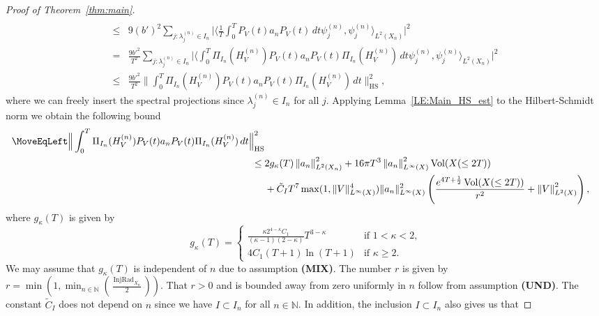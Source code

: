 \documentclass[11pt,twoside,reqno]{amsart}
\newcommand{\N}{\mathbb{N}}
\newcommand{\1}{\mathrm{\mathbf{1}}}
\newcommand{\bHS}{\mathrm{HS}}
\DeclareMathOperator{\Vol}{Vol}
\DeclareMathOperator{\vol}{Vol}
\DeclareMathOperator{\InjRad}{InjRad}
\newcommand{\norm}[1]{\left\lVert#1\right\rVert}
\numberwithin{equation}{section}
\theoremstyle{plain}
\theoremstyle{definition}
\theoremstyle{remark}
\begin{document}
\begin{proof}[Proof of Theorem~\ref{thm:main}]
\begin{equation}
\begin{aligned}
    \\
    \leq{}& 9(b')^2 \sum_{j:\lambda_j^{(n)}\in I_n} \Big| \langle \frac{1}{T} \int_{0}^T P_V(t) a_n P_V(t) \, d t \psi_j^{(n)} , \psi_j^{(n)}\rangle_{L^2(X_n)}  \Big|^2
    \\
    ={}&  \frac{9b'^2}{T^2}  \sum_{j:\lambda_j^{(n)}\in I_n} \Big| \langle  \int_{0}^T \Pi_{I_n}(H_V^{(n)}) P_V(t) a_n P_V(t) \Pi_{I_n}(H_V^{(n)}) \, d t \psi_j^{(n)} , \psi_j^{(n)}\rangle_{L^2(X_n)}  \Big|^2
    \\
    \leq {}& \frac{9b'^2}{T^2} \Big\lVert \int_{0}^T \Pi_{I_n}(H_V^{(n)}) P_V(t) a_n P_V(t) \Pi_{I_n}(H_V^{(n)}) \, d t \Big\rVert_{\bHS}^2,
    \end{aligned}
\end{equation}
where we can freely insert the spectral projections since $\lambda_j^{(n)}\in I_n$ for all $j$. Applying Lemma~\ref{LE:Main_HS_est} to the Hilbert-Schmidt norm we obtain the following bound 
\begin{equation}
    \begin{aligned}
       \MoveEqLeft \Big\lVert \int_{0}^T \Pi_{I_n}(H_V^{(n)}) P_V(t) a_n P_V(t) \Pi_{I_n}(H_V^{(n)}) \, d t \Big\rVert_{\bHS}^2 
       \\
       \leq{}& 2 g_\kappa(T) \norm{a_n}^2_{L^2(X_n)}+  16\pi T^3 \norm{a_n}_{L^\infty(X)}^2 \vol(X(\leq 2T))
       \\
       &+ \tilde{C}_I T^7  \max(1, \lVert V\rVert_{L^\infty(X)}^4)  \lVert a_n \rVert^2_{L^\infty(X)}\left( \frac{  e^{4T+\frac12} \Vol(X(\leq2T))}{r^2} + \norm{V}_{L^2(X)}^2 \right),
        \end{aligned}
    \end{equation}
where $g_\kappa(T)$ is given by
\begin{equation*}
    g_\kappa(T) = \begin{cases}
        \frac{\kappa 2^{4-\kappa} C_1}{(\kappa -1)(2-\kappa)} T^{3-\kappa} & \text{if $1<\kappa<2$,}\\
        4 C_1(T+1)\ln (T+1) & \text{if $\kappa\geq 2$.}
    \end{cases}        
\end{equation*}
We may assume that $g_{\kappa}(T)$ is independent of $n$ due to assumption \textbf{(MIX)}. The number $r$ is given by $r=\min(1,\min_{n\in\N} (\frac{\InjRad_{X_n}}{2}))$. That $r>0$ and is bounded away from zero uniformly in $n$ follow from assumption \textbf{(UND)}. The constant $\tilde{C}_{I}$ does not depend on $n$ since we have $I\subset I_n$ for all $n\in\N$. In addition, the inclusion $I\subset I_n$ also gives us that 

\end{proof}
\end{document}
